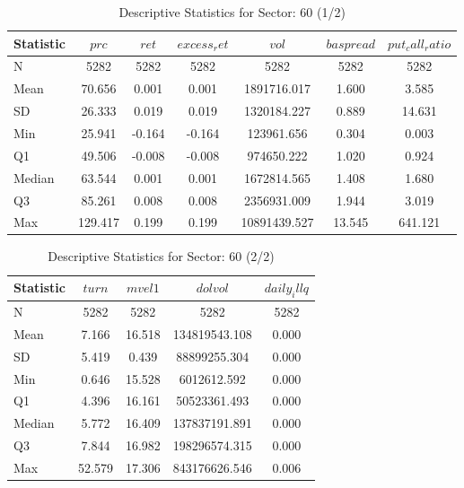     \begin{table}[H]
    \centering

    
    \caption{Descriptive Statistics for Sector: 60 (1/2)}
    \label{tab:sec60_a}
    
    \begin{tabular}{lcccccc}
    \toprule
    Statistic & $prc$ & $ret$ & $excess_ret$ & $vol$ & $baspread$ & $put_call_ratio$ \\\midrule
    N & 5282 & 5282 & 5282 & 5282 & 5282 & 5282 \\
    Mean & 70.656 & 0.001 & 0.001 & 1891716.017 & 1.600 & 3.585 \\
    SD & 26.333 & 0.019 & 0.019 & 1320184.227 & 0.889 & 14.631 \\
    Min & 25.941 & -0.164 & -0.164 & 123961.656 & 0.304 & 0.003 \\
    Q1 & 49.506 & -0.008 & -0.008 & 974650.222 & 1.020 & 0.924 \\
    Median & 63.544 & 0.001 & 0.001 & 1672814.565 & 1.408 & 1.680 \\
    Q3 & 85.261 & 0.008 & 0.008 & 2356931.009 & 1.944 & 3.019 \\
    Max & 129.417 & 0.199 & 0.199 & 10891439.527 & 13.545 & 641.121 \\
    \bottomrule
    \end{tabular}

    \end{table}
    
    \begin{table}[H]
    \centering

    
    \caption{Descriptive Statistics for Sector: 60 (2/2)}
    \label{tab:sec60_b}
    
    \begin{tabular}{lcccc}
    \toprule
    Statistic & $turn$ & $mvel1$ & $dolvol$ & $daily_illq$ \\\midrule
    N & 5282 & 5282 & 5282 & 5282 \\
    Mean & 7.166 & 16.518 & 134819543.108 & 0.000 \\
    SD & 5.419 & 0.439 & 88899255.304 & 0.000 \\
    Min & 0.646 & 15.528 & 6012612.592 & 0.000 \\
    Q1 & 4.396 & 16.161 & 50523361.493 & 0.000 \\
    Median & 5.772 & 16.409 & 137837191.891 & 0.000 \\
    Q3 & 7.844 & 16.982 & 198296574.315 & 0.000 \\
    Max & 52.579 & 17.306 & 843176626.546 & 0.006 \\
    \bottomrule
    \end{tabular}

    \end{table}

